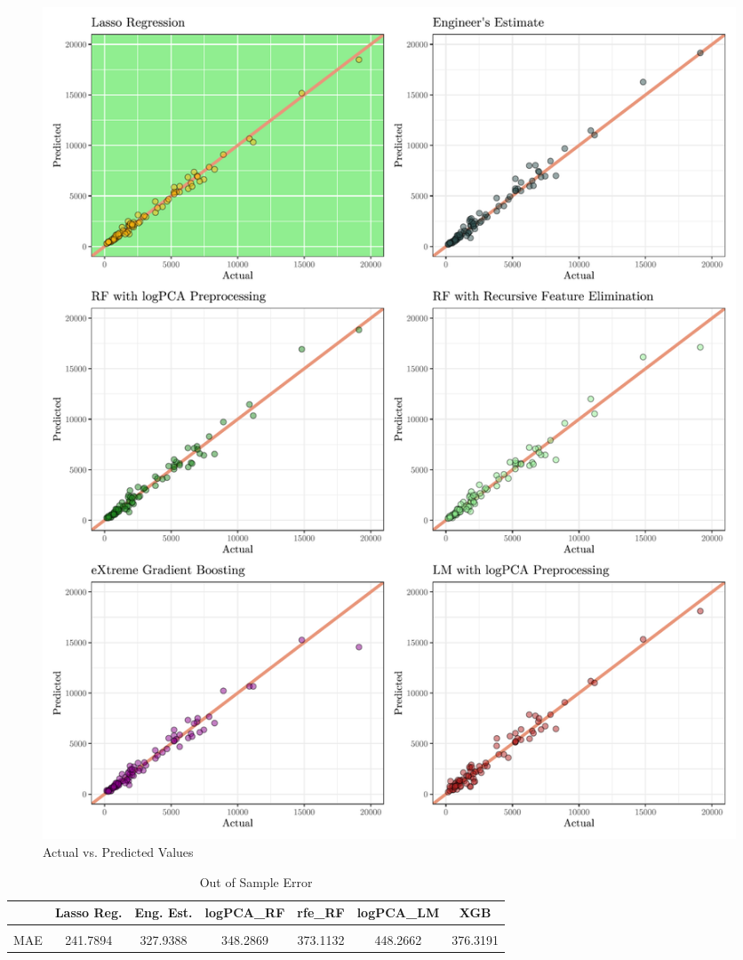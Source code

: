 \documentclass[a4paper,12pt, headsepline]{scrartcl}
\numberwithin{equation}{section}
\begin{document}
\begin{figure}[H]
	\includegraphics[width = 14	cm]{figures/percomp.pdf}
	\caption{Actual vs. Predicted Values}\label{fig:percomp}
\end{figure}


\begin{table}[H]
	\caption{Out of Sample Error}\label{tab:percomp}
	\centering
	\begin{tabular}[t]{lcccccc}
		\toprule
		& Lasso Reg. & Eng. Est. & logPCA\_RF & rfe\_RF & logPCA\_LM & XGB\\
		\midrule
		\cellcolor{gray!6}{RMSE} & \cellcolor{gray!6}{326.1261} & \cellcolor{gray!6}{497.0567} & \cellcolor{gray!6}{509.7934} & \cellcolor{gray!6}{560.7600} & \cellcolor{gray!6}{609.4673} & \cellcolor{gray!6}{671.6634}\\
		MAE & 241.7894 & 327.9388 & 348.2869 & 373.1132 & 448.2662 & 376.3191\\
		\bottomrule
	\end{tabular}
\end{table}
\end{document}
